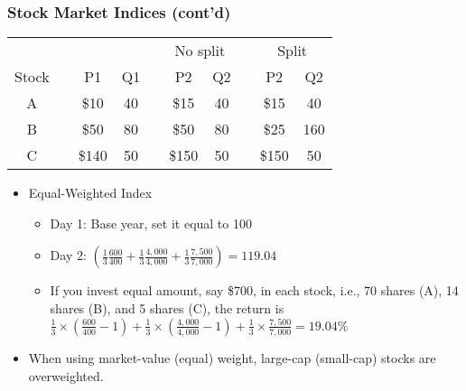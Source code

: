 \documentclass[10pt]{beamer}
\begin{document}
	
	\begin{frame}[t]
		\frametitle{Stock Market Indices (cont'd)}
		
		\begin{table}[]
			\begin{tabular}{cccccccccc}
				&  &  &  &  & \multicolumn{2}{c}{No split} & & \multicolumn{2}{c}{Split} \\ \cline{6-7} \cline{9-10} 
				Stock &  & P1    & Q1 &  & P2    & Q2  &  & P2    & Q2  \\ \cline{1-1} \cline{3-4} \cline{6-7} \cline{9-10} 
				A     &  & \$10  & 40 &  & \$15  & 40  &  & \$15  & 40  \\
				B     &  & \$50  & 80 &  & \$50  & 80 &  & \$25  & 160 \\
				C     &  & \$140 & 50 &  & \$150 & 50  &  & \$150 & 50 
			\end{tabular}
		\end{table}
		
		
		\begin{itemize}
			\item Equal-Weighted Index	
			\begin{itemize}
				\item Day 1: Base year, set it equal to 100
				\item Day 2: $ (\frac{1}{3} \frac{600}{400} + \frac{1}{3} \frac{4,000}{4,000} + \frac{1}{3} \frac{7,500}{7,000}) = 119.04 $
				
				\item If you invest equal amount, say \$700, in each stock, i.e., 70 shares (A), 14 shares (B), and 5 shares (C), the return is $ \frac{1}{3} \times (\frac{600}{400}-1) + \frac{1}{3} \times (\frac{4,000}{4,000}-1) + \frac{1}{3} \times \frac{7,500}{7,000} = 19.04\%  $
			\end{itemize}
			
			\item When using market-value (equal) weight, large-cap (small-cap) stocks are overweighted.
		\end{itemize}
		
	\end{frame}
	
	
	
\end{document}
